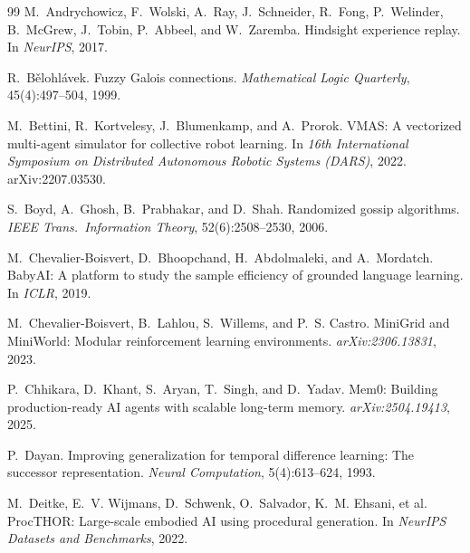 \documentclass{article}
\begin{document}
\clearpage
\begin{thebibliography}{99}
M.~Andrychowicz, F.~Wolski, A.~Ray, J.~Schneider, R.~Fong, P.~Welinder, B.~McGrew, J.~Tobin, P.~Abbeel, and W.~Zaremba.
\newblock Hindsight experience replay.
\newblock In \emph{NeurIPS}, 2017.

R.~B\v{e}lohl\'avek.
\newblock Fuzzy Galois connections.
\newblock \emph{Mathematical Logic Quarterly}, 45(4):497--504, 1999.

M.~Bettini, R.~Kortvelesy, J.~Blumenkamp, and A.~Prorok.
\newblock VMAS: A vectorized multi-agent simulator for collective robot learning.
\newblock In \emph{16th International Symposium on Distributed Autonomous Robotic Systems (DARS)}, 2022.
\newblock arXiv:2207.03530.

S.~Boyd, A.~Ghosh, B.~Prabhakar, and D.~Shah.
\newblock Randomized gossip algorithms.
\newblock \emph{IEEE Trans.\ Information Theory}, 52(6):2508--2530, 2006.

M.~Chevalier-Boisvert, D.~Bhoopchand, H.~Abdolmaleki, and A.~Mordatch.
\newblock BabyAI: A platform to study the sample efficiency of grounded language learning.
\newblock In \emph{ICLR}, 2019.

M.~Chevalier-Boisvert, B.~Lahlou, S.~Willems, and P.~S. Castro.
\newblock MiniGrid and MiniWorld: Modular reinforcement learning environments.
\newblock \emph{arXiv:2306.13831}, 2023.

P.~Chhikara, D.~Khant, S.~Aryan, T.~Singh, and D.~Yadav.
\newblock Mem0: Building production-ready AI agents with scalable long-term memory.
\newblock \emph{arXiv:2504.19413}, 2025.

P.~Dayan.
\newblock Improving generalization for temporal difference learning: The successor representation.
\newblock \emph{Neural Computation}, 5(4):613--624, 1993.

M.~Deitke, E.~V. Wijmans, D.~Schwenk, O.~Salvador, K.~M. Ehsani, et al.
\newblock ProcTHOR: Large-scale embodied AI using procedural generation.
\newblock In \emph{NeurIPS Datasets and Benchmarks}, 2022.


\end{thebibliography}
\end{document}
